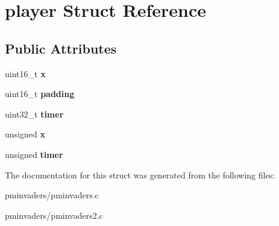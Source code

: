 \hypertarget{structplayer}{}\section{player Struct Reference}
\label{structplayer}
\subsection*{Public Attributes}
\begin{DoxyCompactItemize}
\item 
\mbox{\label{structplayer_a84b21194e553694625bc972caf10c235}} 
uint16\+\_\+t {\bfseries x}
\item 
\mbox{\label{structplayer_affec4383eb4744d7913da90bbb514402}} 
uint16\+\_\+t {\bfseries padding}
\item 
\mbox{\label{structplayer_a5f14ed0c487614f4ecb76e0a95d74625}} 
uint32\+\_\+t {\bfseries timer}
\item 
\mbox{\label{structplayer_ae51629ccb4db01ee8cc5ab9b3599e6ef}} 
unsigned {\bfseries x}
\item 
\mbox{\label{structplayer_a88fe43f4fe67aa0fc2166fb3131f1332}} 
unsigned {\bfseries timer}
\end{DoxyCompactItemize}


The documentation for this struct was generated from the following files\+:\begin{DoxyCompactItemize}
\item 
pminvaders/pminvaders.\+c\item 
pminvaders/pminvaders2.\+c\end{DoxyCompactItemize}
